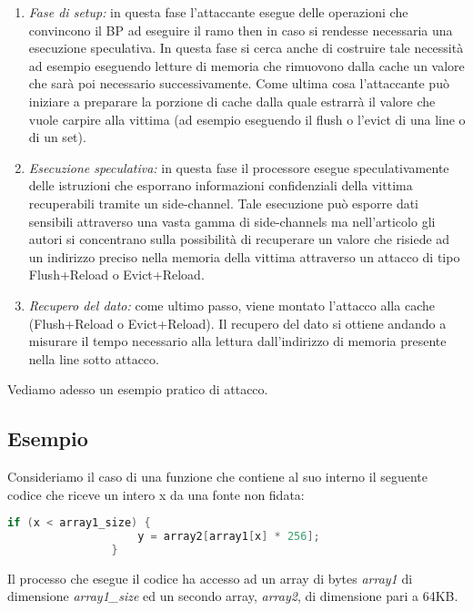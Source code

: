 		\begin{enumerate}
			\item \emph{Fase di setup:} in questa fase l'attaccante esegue delle operazioni che convincono il \ac{BP} ad eseguire il ramo then in caso si rendesse necessaria una esecuzione speculativa. In questa fase si cerca anche di costruire tale necessità ad esempio eseguendo letture di memoria che rimuovono dalla cache un valore che sarà poi necessario successivamente. Come ultima cosa l'attaccante può iniziare a preparare la porzione di cache dalla quale estrarrà il valore che vuole carpire alla vittima (ad esempio eseguendo il flush o l'evict di una line o di un set).
			\item \emph{Esecuzione speculativa:} in questa fase il processore esegue speculativamente delle istruzioni che esporrano informazioni confidenziali della vittima recuperabili tramite un side-channel. Tale esecuzione può esporre dati sensibili attraverso una vasta gamma di side-channels ma nell'articolo gli autori si concentrano sulla possibilità di recuperare un valore che risiede ad un indirizzo preciso nella memoria della vittima attraverso un attacco di tipo Flush+Reload o Evict+Reload.
			\item \emph{Recupero del dato:} come ultimo passo, viene montato l'attacco alla cache (Flush+Reload o Evict+Reload). Il recupero del dato si ottiene andando a misurare il tempo necessario alla lettura dall'indirizzo di memoria presente nella line sotto attacco.
		\end{enumerate}
	
		Vediamo adesso un esempio pratico di attacco.
		
		\subsection{Esempio}
		
			Consideriamo il caso di una funzione che contiene al suo interno il seguente codice che riceve un intero x da una fonte non fidata:
			
			\begin{lstlisting}[language={C}, frame={none},basicstyle={\footnotesize}]
				if (x < array1_size) {
					y = array2[array1[x] * 256];
				}
			\end{lstlisting}
			
			Il processo che esegue il codice ha accesso ad un array di bytes \emph{array1} di dimensione \emph{array1\_size} ed un secondo array, \emph{array2}, di dimensione pari a 64KB.
			
